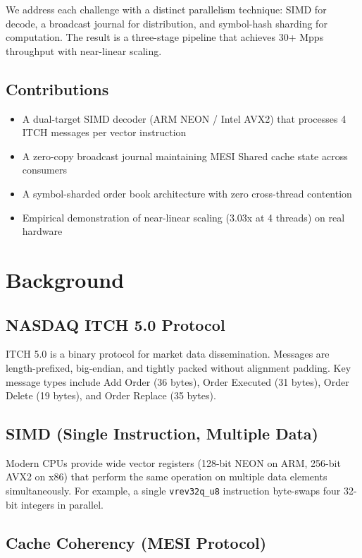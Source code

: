 \documentclass[conference]{IEEEtran}
\begin{document}
We address each challenge with a distinct parallelism technique: SIMD for decode, a broadcast journal for distribution, and symbol-hash sharding for computation. The result is a three-stage pipeline that achieves 30+ Mpps throughput with near-linear scaling.

\subsection{Contributions}

\begin{itemize}
    \item A dual-target SIMD decoder (ARM NEON / Intel AVX2) that processes 4 ITCH messages per vector instruction
    \item A zero-copy broadcast journal maintaining MESI Shared cache state across consumers
    \item A symbol-sharded order book architecture with zero cross-thread contention
    \item Empirical demonstration of near-linear scaling (3.03x at 4 threads) on real hardware
\end{itemize}

\section{Background}

\subsection{NASDAQ ITCH 5.0 Protocol}

ITCH 5.0 is a binary protocol for market data dissemination. Messages are length-prefixed, big-endian, and tightly packed without alignment padding. Key message types include Add Order (36 bytes), Order Executed (31 bytes), Order Delete (19 bytes), and Order Replace (35 bytes).

\subsection{SIMD (Single Instruction, Multiple Data)}

Modern CPUs provide wide vector registers (128-bit NEON on ARM, 256-bit AVX2 on x86) that perform the same operation on multiple data elements simultaneously. For example, a single \texttt{vrev32q\_u8} instruction byte-swaps four 32-bit integers in parallel.

\subsection{Cache Coherency (MESI Protocol)}
\end{document}
